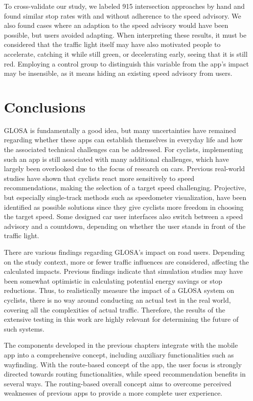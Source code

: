 \begin{Summary}
To cross-validate our study, we labeled 915 intersection approaches by hand and found similar stop rates with and without adherence to the speed advisory. We also found cases where an adaption to the speed advisory would have been possible, but users avoided adapting. When interpreting these results, it must be considered that the traffic light itself may have also motivated people to accelerate, catching it while still green, or decelerating early, seeing that it is still red. Employing a control group to distinguish this variable from the app's impact may be insensible, as it means hiding an existing speed advisory from users.
\end{Summary}

\section{Conclusions}

GLOSA is fundamentally a good idea, but many uncertainties have remained regarding whether these apps can establish themselves in everyday life and how the associated technical challenges can be addressed. For cyclists, implementing such an app is still associated with many additional challenges, which have largely been overlooked due to the focus of research on cars. Previous real-world studies have shown that cyclists react more sensitively to speed recommendations, making the selection of a target speed challenging. Projective, but especially single-track methods such as speedometer visualization, have been identified as possible solutions since they give cyclists more freedom in choosing the target speed. Some designed car user interfaces also switch between a speed advisory and a countdown, depending on whether the user stands in front of the traffic light.

There are various findings regarding GLOSA's impact on road users. Depending on the study context, more or fewer traffic influences are considered, affecting the calculated impacts. Previous findings indicate that simulation studies may have been somewhat optimistic in calculating potential energy savings or stop reductions. Thus, to realistically measure the impact of a GLOSA system on cyclists, there is no way around conducting an actual test in the real world, covering all the complexities of actual traffic. Therefore, the results of the extensive testing in this work are highly relevant for determining the future of such systems.

The components developed in the previous chapters integrate with the mobile app into a comprehensive concept, including auxiliary functionalities such as wayfinding. With the route-based concept of the app, the user focus is strongly directed towards routing functionalities, while speed recommendation benefits in several ways. The routing-based overall concept aims to overcome perceived weaknesses of previous apps to provide a more complete user experience.

